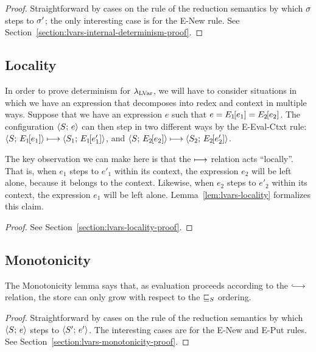 \LVarsLemInternalDeterminism
\begin{proof}
  Straightforward by cases on the rule of the reduction semantics by
  which $\sigma$ steps to $\sigma'$; the only interesting case is for
  the {\sc E-New} rule.  See
  Section~\ref{section:lvars-internal-determinism-proof}.
\end{proof}

\subsection{Locality}

In order to prove determinism for $\lambda_{\textrm{LVar}}$, we will have to
consider situations in which we have an expression that decomposes
into redex and context in multiple ways.  Suppose that we have an
expression $e$ such that $e = E_1\hspace{-1mm}\left[e_1\right] =
E_2\hspace{-1mm}\left[e_2\right]$.  The configuration $\langle S;\, e \rangle$ can then step
in two different ways by the {\sc E-Eval-Ctxt} rule:
$\langle S;\, E_1\hspace{-1mm}\left[e_1\right] \rangle \longmapsto
\langle S_1;\, E_1\hspace{-1mm}\left[e'_1\right] \rangle$, and
$\langle S;\, E_2\hspace{-1mm}\left[e_2\right] \rangle \longmapsto
\langle S_2;\, E_2\hspace{-1mm}\left[e'_2\right] \rangle$.

The key observation we can make here is that the $\longmapsto$
relation acts ``locally''.  That is, when $e_1$ steps to $e'_1$ within
its context, the expression $e_2$ will be left alone, because it
belongs to the context.  Likewise, when $e_2$ steps to $e'_2$ within
its context, the expression $e_1$ will be left alone.
Lemma~\ref{lem:lvars-locality} formalizes this claim.

\LVarsLemLocality
\begin{proof}
   See
  Section~\ref{section:lvars-locality-proof}.
\end{proof}

\subsection{Monotonicity}

The Monotonicity lemma says that, as evaluation proceeds according to
the $\parstepsto$ relation, the store can only grow with respect to
the $ \sqsubseteq_S $ ordering.

\LVarsLemMonotonicity
\begin{proof}
  Straightforward by cases on the rule of the reduction semantics by
  which $\langle S;\, e \rangle$ steps to $\langle S';\, e' \rangle$. The interesting
  cases are for the {\sc E-New} and {\sc E-Put} rules.  See
  Section~\ref{section:lvars-monotonicity-proof}.
\end{proof}

